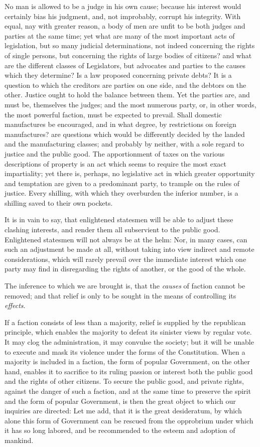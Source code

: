 No man is allowed to be a judge in his own cause; because his interest
would certainly bias his judgment, and, not improbably, corrupt his
integrity. With equal, nay with greater reason, a body of men are
unfit to be both judges and parties at the same time; yet what are
many of the most important acts of legislation, but so many judicial
determinations, not indeed concerning the rights of single persons,
but concerning the rights of large bodies of citizens? and what are
the different classes of Legislators, but advocates and parties to the
causes which they determine? Is a law proposed concerning private
debts? It is a question to which the creditors are parties on one
side, and the debtors on the other. Justice ought to hold the balance
between them. Yet the parties are, and must be, themselves the judges;
and the most numerous party, or, in other words, the most powerful
faction, must be expected to prevail. Shall domestic manufactures be
encouraged, and in what degree, by restrictions on foreign
manufactures? are questions which would be differently decided by the
 landed and the manufacturing classes; and probably by
neither, with a sole regard to justice and the public good. The
apportionment of taxes on the various descriptions of property is an
act which seems to require the most exact impartiality; yet there is,
perhaps, no legislative act in which greater opportunity and
temptation are given to a predominant party, to trample on the rules
of justice. Every shilling, with which they overburden the inferior
number, is a shilling saved to their own pockets.

It is in vain to say, that enlightened statesmen will be able to
adjust these clashing interests, and render them all subservient to
the public good. Enlightened statesmen will not always be at the helm:
Nor, in many cases, can such an adjustment be made at all, without
taking into view indirect and remote considerations, which will rarely
prevail over the immediate interest which one party may find in
disregarding the rights of another, or the good of the whole.

The inference to which we are brought is, that the \textit{causes} of
faction cannot be removed; and that relief is only to be sought in the
means of controlling its \textit{effects}.

If a faction consists of less than a majority, relief is supplied by
the republican principle, which enables the majority to defeat its
sinister views by regular vote. It may clog the administration, it may
convulse the society; but it will be unable to execute and mask its
violence under the forms of the Constitution. When a majority is
included in a faction, the form of popular Government, on the other
hand, enables it to sacrifice to its ruling passion or interest both
the public good and the rights of other citizens. To secure the public
good, and private rights, against the danger of such a faction, and at
the same time to preserve the spirit and the form of popular
Government, is then the great object to which  our inquiries
are directed: Let me add, that it is the great desideratum, by which
alone this form of Government can be rescued from the opprobrium under
which it has so long labored, and be recommended to the esteem and
adoption of mankind.

